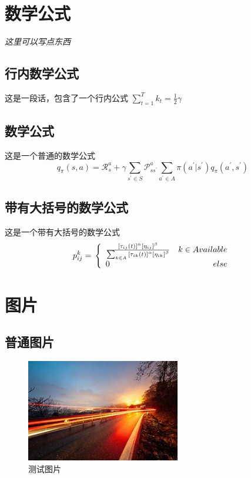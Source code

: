 \documentclass[bachelor,nocolorlinks, printoneside]{seuthesis} %
\begin{document}
\begin{Main} %

\chapter{数学公式}
\emph{这里可以写点东西}
\section{行内数学公式}
这是一段话，包含了一个行内公式
$\sum_{t=1}^{T}{k_t} = \frac{1}{2} \gamma$
\section{数学公式}
这是一个普通的数学公式
\begin{equation}q_{\pi}(s,a)=\mathcal{R}^a_{s}+\gamma\sum_{s^{\prime}\in S}{\mathcal{P}^a_{ss^{\prime}}\sum_{a^{\prime}\in A}\pi(a^{\prime}|s^{\prime})q_{\pi}(a^{\prime},s^{\prime})}
\end{equation}

\section{带有大括号的数学公式}
这是一个带有大括号的数学公式
\begin{equation}
p_{ij}^{k}=\\
\left\{
    \begin{array}{lr}
    \frac{{\lbrack \tau_{ij}(t)\rbrack}^{\alpha}{\lbrack \eta_{ij}\rbrack}^{\beta}}{\sum_{k \in A}{{\lbrack \tau_{ik}(t)\rbrack}^{\alpha}{\lbrack \eta_{ik}\rbrack}^{\beta}} }  &  k \in Available\\
    0 &else
    \end{array}
\right.
\end{equation}

\chapter{图片}
\section{普通图片}
\begin{figure}[htbp!]
    \centering \includegraphics[width=0.6\textwidth]{img/1.jpg} \caption{测试图片}
\end{figure}


\end{Main}
\end{document}
